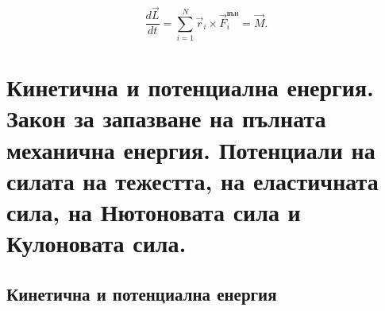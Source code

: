 \documentclass{report}
\begin{document}
\begin{equation}
\frac{d\vec{L}}{dt} = \sum_{i=1}^N \vec{r}_i \times \vec{F}_i^{\text{вън}} = \vec{M}.
\end{equation}


\section{Кинетична и потенциална енергия. Закон за запазване на пълната механична
енергия. Потенциали на силата на тежестта, на еластичната сила, на Нютоновата
сила и Кулоновата сила.}
\subsection{Кинетична и потенциална енергия}
\end{document}
